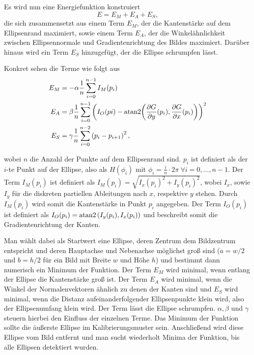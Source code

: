 Es wird nun eine Energiefunktion konstruiert
\[
	E = E_M + E_A + E_S,
\]
die sich zusammensetzt aus einem Term $E_M$, der die Kantenstärke auf dem Ellipsenrand maximiert, sowie einem Term $E_A$, der die Winkelähnlichkeit zwischen Ellipsennormale und Gradientenrichtung des Bildes maximiert. Darüber hinaus wird ein Term $E_S$ hinzugefügt, der die Ellipse schrumpfen lässt.

Konkret sehen die Terme wie folgt aus
\begin{equation}\label{eq:deformTerms}
	\begin{aligned}
		E_M &= -\alpha\frac{1}{n}\sum_{i=0}^{n-1}I_M(p_i) \\
		E_A &= \beta\frac{1}{n}\sum_{i=0}^{n-1}\left(I_O(pi) - \text{atan2}{\left(\frac{\partial G}{\partial y}(p_i), \frac{\partial G}{\partial x}(p_i)\right)}\right)^2 \\
		E_S &= \gamma\frac{1}{n}\sum_{i=0}^{n-2}\left(p_i - p_{i+1}\right)^2,
	\end{aligned}
\end{equation}

wobei $n$ die Anzahl der Punkte auf dem Ellipsenrand sind. $p_i$ ist definiert als der $i$-te Punkt auf der Ellipse, also als $H(\phi_i)$ mit $\phi_i = \frac{i}{n}\cdot2\pi ~\forall i = 0,\dotsc,n-1$.
Der Term $I_M(p_i)$ ist definiert als $I_M(p_i) = \sqrt{I_x(p_i)^2 + I_y(p_i)^2}$, wobei $I_x$, sowie $I_y$ für die diskreten partiellen Ableitungen nach $x$, respektive $y$ stehen. Durch $I_M(p_i)$ wird somit die Kantenstärke in Punkt $p_i$ angegeben. Der Term $I_O(p_i)$ ist definiert als $I_O(p_i) = \text{atan2}\left(I_y(p_i),I_x(p_i)\right)$
und beschreibt somit die Gradientenrichtung der Kanten.

Man wählt dabei als Startwert eine Ellipse, deren Zentrum dem Bildzentrum entspricht und deren Hauptachse und Nebenachse möglichst groß sind ($a = w/2$ und $b = h/2$ für ein Bild mit Breite $w$ und Höhe $h$) und bestimmt dann numerisch ein Minimum der Funktion. Der Term $E_M$ wird minimal, wenn entlang der Ellipse die Kantenstärke groß ist. Der Term $E_A$ wird minimal, wenn die Winkel der Normalenvektoren ähnlich zu denen der Kanten sind und $E_S$ wird minimal, wenn die Distanz aufeinanderfolgender Ellipsenpunkte klein wird, also der Ellipsenumfang klein wird. Der Term lässt die Ellipse schrumpfen. $\alpha, \beta$ und $\gamma$ steuern hierbei den Einfluss der einzelnen Terme. Das Minimum der Funktion sollte die äußerste Ellipse im Kalibrierungsmuster sein. Anschließend wird diese Ellipse vom Bild entfernt und man sucht wiederholt Minima der Funktion, bis alle Ellipsen detektiert wurden.




